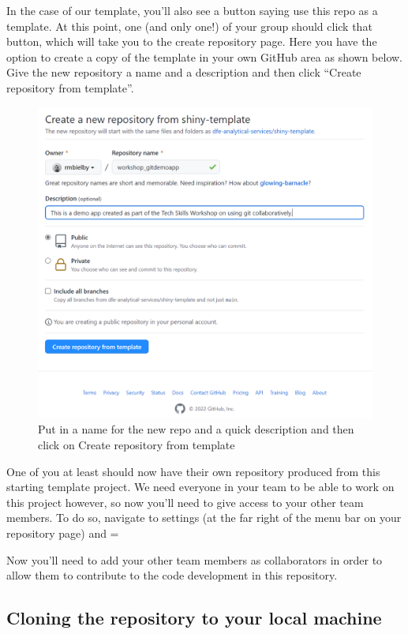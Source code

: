 \documentclass[
  12pt,
]{article}
\begin{document}
In the case of our template, you'll also see a button saying use this
repo as a template. At this point, one (and only one!) of your group
should click that button, which will take you to the create repository
page. Here you have the option to create a copy of the template in your
own GitHub area as shown below. Give the new repository a name and a
description and then click ``Create repository from template''.

\begin{figure}
\includegraphics[width=0.72\linewidth]{images/gitdemo/gitdemo-shinydash-newrepofromtemplate} \caption{Put in a name for the new repo and a quick description and then click on Create repository from template}\label{fig:unnamed-chunk-3}
\end{figure}

One of you at least should now have their own repository produced from
this starting template project. We need everyone in your team to be able
to work on this project however, so now you'll need to give access to
your other team members. To do so, navigate to settings (at the far
right of the menu bar on your repository page) and =

Now you'll need to add your other team members as collaborators in order
to allow them to contribute to the code development in this repository.

\hypertarget{cloning-the-repository-to-your-local-machine}{%
\subsection{Cloning the repository to your local
machine}\label{cloning-the-repository-to-your-local-machine}}
\end{document}
